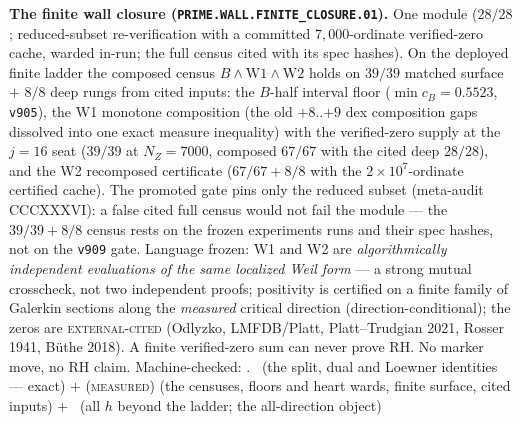 \documentclass[11pt,a4paper]{article}
\theoremstyle{definition}
\begin{document}
\par\smallskip\noindent\textbf{The finite wall closure
(\texttt{PRIME.WALL.FINITE\_\allowbreak CLOSURE.01}).}
One module ($28/28$; reduced-subset re-verification with a
committed $7{,}000$-ordinate verified-zero cache, warded
in-run; the full census cited with its spec hashes).  On the
deployed finite ladder the composed census $B \wedge
\mathrm{W1} \wedge \mathrm{W2}$ holds on $39/39$ matched
surface $+$ $8/8$ deep rungs from cited inputs: the $B$-half
interval floor ($\min c_B = 0.5523$, \texttt{v905}), the W1
monotone composition (the old $+8$..$+9$ dex composition gaps
dissolved into one exact measure inequality) with the
verified-zero supply at the $j = 16$ seat ($39/39$ at
$N_Z = 7000$, composed $67/67$ with the cited deep $28/28$),
and the W2 recomposed certificate ($67/67 + 8/8$ with the
$2\times10^{7}$-ordinate certified cache).  The promoted gate
pins only the reduced subset (meta-audit CCCXXXVI): a false
cited full census would not fail the module --- the $39/39 +
8/8$ census rests on the frozen experiments runs and their spec
hashes, not on the \texttt{v909} gate.  Language frozen: W1
and W2 are \emph{algorithmically independent evaluations of the
same localized Weil form} --- a strong mutual crosscheck, not
two independent proofs; positivity is certified on a finite
family of Galerkin sections along the \emph{measured} critical
direction (direction-conditional); the zeros are
\textsc{external-cited} (Odlyzko, LMFDB/Platt, Platt--Trudgian
2021, Rosser 1941, B\"uthe 2018).  A finite verified-zero sum
can never prove RH.  No marker move, no RH claim.
Machine-checked: .
\mE\ (the split, dual and Loewner identities --- exact) $+$
(\textsc{measured}) (the censuses, floors and heart wards,
finite surface, cited inputs) $+$ \mO\ (all $h$ beyond the
ladder; the all-direction object)
\par\smallskip
\end{document}
